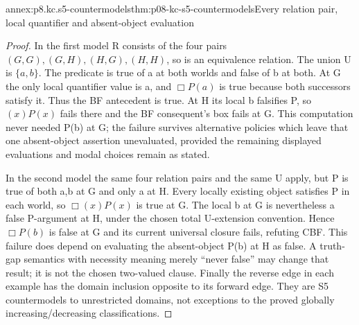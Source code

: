 \begin{annexitem}{annex:p8.kc.s5-countermodels}{thm:p08-kc-s5-countermodels}{Every relation pair, local quantifier and absent-object evaluation}
\begin{proof}
In the first model R consists of the four pairs
\((G,G),(G,H),(H,G),(H,H)\), so is an equivalence relation.
The union U is \(\{a,b\}\). The predicate is true of a
at both worlds and false of b at both. At G the only local
quantifier value is a, and \(\Box P(a)\) is true because
both successors satisfy it. Thus the BF antecedent is true.
At H its local b falsifies P, so \((x)P(x)\) fails there
and the BF consequent's box fails at G. This computation
never needed P(b) at G; the failure survives alternative
policies which leave that one absent-object assertion unevaluated,
provided the remaining displayed evaluations and modal choices
remain as stated.

In the second model the same four relation pairs and the same
U apply, but P is true of both a,b at G and only a at H.
Every locally existing object satisfies P in each world, so
\(\Box(x)P(x)\) is true at G. The local b at G is
nevertheless a false P-argument at H, under the chosen total
U-extension convention. Hence \(\Box P(b)\) is false at G
and its current universal closure fails, refuting CBF. This
failure does depend on evaluating the absent-object P(b) at H
as false. A truth-gap semantics with necessity meaning merely
``never false'' may change that result; it is not the chosen
two-valued clause. Finally the reverse edge in each example
has the domain inclusion opposite to its forward edge. They
are S5 countermodels to unrestricted domains, not exceptions
to the proved globally increasing/decreasing classifications.
\end{proof}
\end{annexitem}

